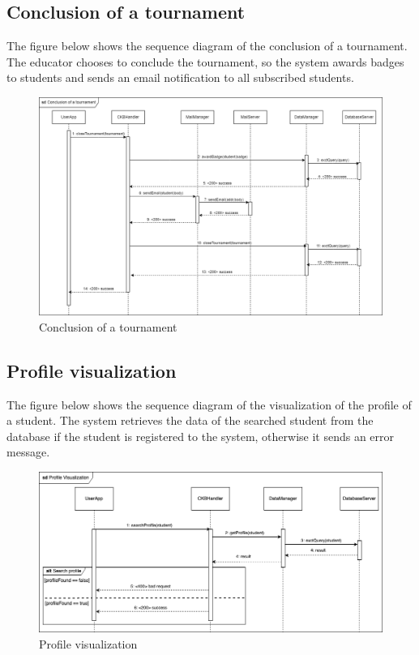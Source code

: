 \subsection{Conclusion of a tournament}
The figure below shows the sequence diagram of the conclusion of a tournament. The educator chooses to conclude the tournament, so the system 
awards badges to students and sends an email notification to all subscribed students.\\
\begin{figure}[H]
    \centering
    \includegraphics[width=1\textwidth]{images/seq_diagrams/tournament_conclusion_DD.png}
    \caption{Conclusion of a tournament}
\end{figure}
\clearpage

\subsection{Profile visualization}
The figure below shows the sequence diagram of the visualization of the profile of a student. 
The system retrieves the data of the searched student from the database if the student is registered to the system, otherwise it sends an 
error message.\\
\begin{figure}[H]
    \centering
    \includegraphics[width=1\textwidth]{images/seq_diagrams/ProfileVis_DD.png}
    \caption{Profile visualization}
\end{figure}
\clearpage

